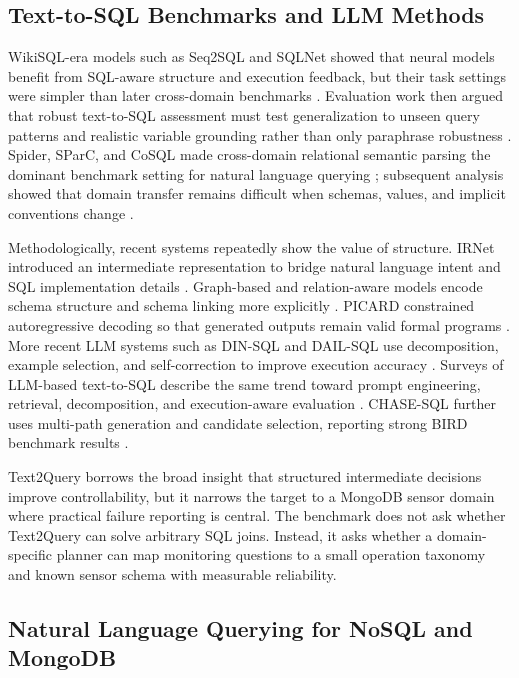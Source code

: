 \documentclass[11pt]{article}
\begin{document}
\subsection{Text-to-SQL Benchmarks and LLM Methods}

WikiSQL-era models such as Seq2SQL and SQLNet showed that neural models benefit from SQL-aware structure and execution feedback, but their task settings were simpler than later cross-domain benchmarks \cite{zhong2017seq2sql,xu2017sqlnet}. Evaluation work then argued that robust text-to-SQL assessment must test generalization to unseen query patterns and realistic variable grounding rather than only paraphrase robustness \cite{finegan2018improving}. Spider, SParC, and CoSQL made cross-domain relational semantic parsing the dominant benchmark setting for natural language querying \cite{yu2018spider,yu2019sparc,yu2019cosql}; subsequent analysis showed that domain transfer remains difficult when schemas, values, and implicit conventions change \cite{suhr2020generalization}.

Methodologically, recent systems repeatedly show the value of structure. IRNet introduced an intermediate representation to bridge natural language intent and SQL implementation details \cite{guo2019irnet}. Graph-based and relation-aware models encode schema structure and schema linking more explicitly \cite{bogin2019schema,wang2020ratsql}. PICARD constrained autoregressive decoding so that generated outputs remain valid formal programs \cite{scholak2021picard}. More recent LLM systems such as DIN-SQL and DAIL-SQL use decomposition, example selection, and self-correction to improve execution accuracy \cite{pourreza2023dinsql,gao2023dailsql}. Surveys of LLM-based text-to-SQL describe the same trend toward prompt engineering, retrieval, decomposition, and execution-aware evaluation \cite{rajkumar2022evaluating,shi2024survey,hong2024survey}. CHASE-SQL further uses multi-path generation and candidate selection, reporting strong BIRD benchmark results \cite{pourreza2025chase}.

Text2Query borrows the broad insight that structured intermediate decisions improve controllability, but it narrows the target to a MongoDB sensor domain where practical failure reporting is central. The benchmark does not ask whether Text2Query can solve arbitrary SQL joins. Instead, it asks whether a domain-specific planner can map monitoring questions to a small operation taxonomy and known sensor schema with measurable reliability.

\subsection{Natural Language Querying for NoSQL and MongoDB}
\end{document}
